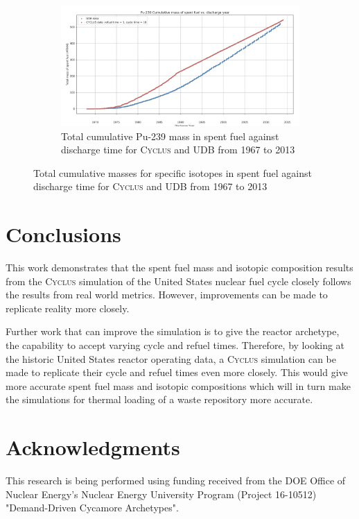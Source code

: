 \documentclass{anstrans}
\newcommand{\Cyclus}{\textsc{Cyclus}\xspace}%
\begin{document}
\begin{figure}[h]
\begin{subfigure}[b]{0.45\textwidth}
		\centering 
		\includegraphics[width=\textwidth]{Pu-239_cumulative_mass_spent_fuel_original}
		\caption[]%
		{{\small Total cumulative Pu-239 mass in spent fuel against discharge time for \Cyclus and UDB from 1967 to 2013}}    
		\label{fig:total_pu240}
	\end{subfigure}
\caption{Total cumulative masses for specific isotopes in spent fuel against discharge time for \Cyclus and UDB from 1967 to 2013}
\end{figure}

\section{Conclusions}
This work demonstrates that the spent fuel mass and isotopic composition results from the \Cyclus simulation of the United States nuclear fuel cycle closely follows the results from real world metrics. However, improvements can be made to replicate reality more closely. 

Further work that can improve the simulation is to give the reactor archetype, the capability to accept varying cycle and refuel times. Therefore, by looking at the historic United States reactor operating data, a \Cyclus simulation can be made to replicate their cycle and refuel times even more closely. This would give more accurate spent fuel mass and isotopic compositions which will in turn make the simulations for thermal loading of a waste repository more accurate. 

\section{Acknowledgments}
This research is being performed using funding received from the DOE Office of Nuclear Energy's
Nuclear Energy University Program (Project 16-10512) "Demand-Driven Cycamore Archetypes". 

\pagebreak


\end{document}
